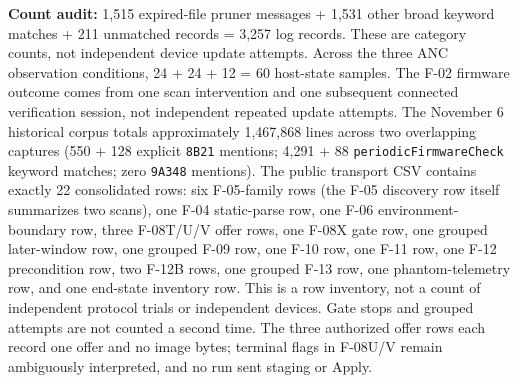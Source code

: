 \documentclass[11pt,letterpaper]{article}
\begin{document}
\noindent\textbf{Count audit:} 1,515 expired-file pruner messages + 1,531 other broad keyword matches + 211 unmatched records = 3,257 log records. These are category counts, not independent device update attempts. Across the three ANC observation conditions, 24 + 24 + 12 = 60 host-state samples. The F-02 firmware outcome comes from one scan intervention and one subsequent connected verification session, not independent repeated update attempts. The November 6 historical corpus totals approximately 1,467,868 lines across two overlapping captures (550 + 128 explicit \texttt{8B21} mentions; 4,291 + 88 \texttt{periodicFirmwareCheck} keyword matches; zero \texttt{9A348} mentions). The public transport CSV contains exactly 22 consolidated rows: six F-05-family rows (the F-05 discovery row itself summarizes two scans), one F-04 static-parse row, one F-06 environment-boundary row, three F-08T/U/V offer rows, one F-08X gate row, one grouped later-window row, one grouped F-09 row, one F-10 row, one F-11 row, one F-12 precondition row, two F-12B rows, one grouped F-13 row, one phantom-telemetry row, and one end-state inventory row. This is a row inventory, not a count of independent protocol trials or independent devices. Gate stops and grouped attempts are not counted a second time. The three authorized offer rows each record one offer and no image bytes; terminal flags in F-08U/V remain ambiguously interpreted, and no run sent staging or Apply.
\end{document}
